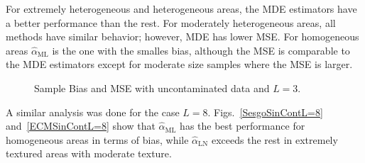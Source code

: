 \documentclass[twocolumn]{svjour3}
\begin{document}
For extremely heterogeneous and heterogeneous areas, the MDE estimators have a better performance than the rest. 
For moderately heterogeneous areas, all methods have similar behavior; however, MDE has lower MSE. 
For homogeneous areas $\widehat{\alpha}_{\text{{ML}}}$ is the one with the smalles bias, although the MSE is comparable to the MDE estimators except for moderate size samples where the MSE is larger.

\begin{figure}[htb]
	\centering
	\caption{\label{SesgoyECMSinContL=3}\small Sample Bias and MSE with uncontaminated data and $L=3$.}
\end{figure}    

A similar analysis was done for the case $L=8$. Figs.~\ref{SesgoSinContL=8} and~\ref{ECMSinContL=8} show that $\widehat{\alpha}_{\text{{ML}}}$ has the best performance for homogeneous
areas in terms of bias, while $\widehat{\alpha}_{\text{{LN}}}$ exceeds the rest in extremely textured areas with moderate texture.
\end{document}
